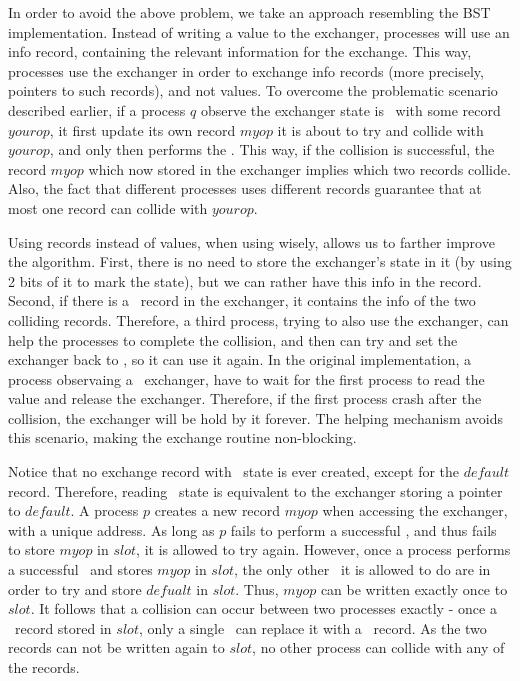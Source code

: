 In order to avoid the above problem, we take an approach resembling the BST implementation. Instead of writing a value to the exchanger, processes will use an info record, containing the relevant information for the exchange. This way, processes use the exchanger in order to exchange info records (more precisely, pointers to such records), and not values. To overcome the problematic scenario described earlier, if a process $q$ observe the exchanger state is \waiting\ with some record $yourop$, it first update its own record $myop$ it is about to try and collide with $yourop$, and only then performs the \CAS. This way, if the collision is successful, the record $myop$ which now stored in the exchanger implies which two records collide. Also, the fact that different processes uses different records guarantee that at most one record can collide with $yourop$.

Using records instead of values, when using wisely, allows us to farther improve the algorithm. First, there is no need to store the exchanger's state in it (by using 2 bits of it to mark the state), but we can rather have this info in the record. Second, if there is a \busy\ record in the exchanger, it contains the info of the two colliding records. Therefore, a third process, trying to also use the exchanger, can help the processes to complete the collision, and then can try and set the exchanger back to \emptyst, so it can use it again. In the original implementation, a process observaing a \busy\ exchanger, have to wait for the first process to read the value and release the exchanger. Therefore, if the first process crash after the collision, the exchanger will be hold by it forever. The helping mechanism avoids this scenario, making the exchange routine non-blocking.

Notice that no exchange record with \emptyst\ state is ever created, except for the $default$ record. Therefore, reading \emptyst\ state is equivalent to the exchanger storing a pointer to $default$. A process $p$ creates a new record $myop$ when accessing the exchanger, with a unique address. As long as $p$ fails to perform a successful \CAS, and thus fails to store $myop$ in $slot$, it is allowed to try again. However, once a process performs a successful \CAS\ and stores $myop$ in $slot$, the only other \CAS\ it is allowed to do are in order to try and store $defualt$ in $slot$. Thus, $myop$ can be written exactly once to $slot$. It follows that a collision can occur between two processes exactly - once a \waiting\ record stored in $slot$, only a single \CAS\ can replace it with a \busy\ record. As the two records can not be written again to $slot$, no other process can collide with any of the records.

